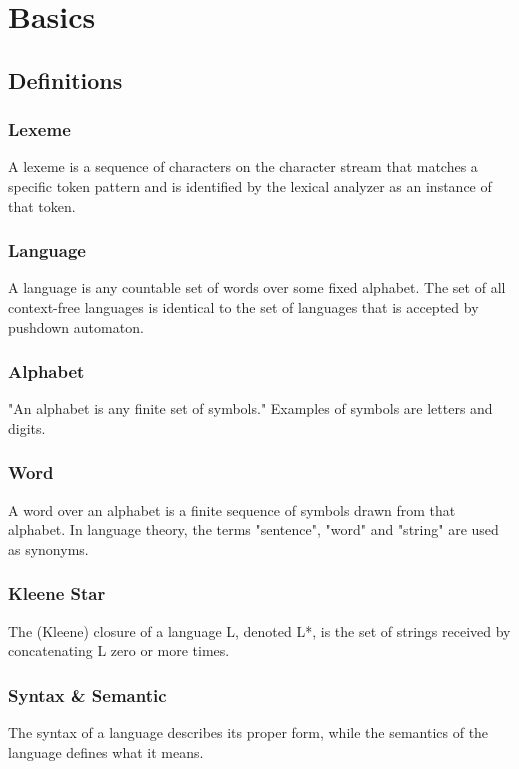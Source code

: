 \chapter{Basics}
\label{cha:basics}
\section{Definitions}
\subsection{Lexeme}
A lexeme is a sequence of characters on the character stream that matches a specific token pattern and is identified by the lexical analyzer as an instance of that token.\cite{DragonBook}

\subsection{Language}
A language is any countable set of words over some fixed alphabet. The set of all context-free languages is identical to the set of languages that is accepted by pushdown automaton.\cite{DragonBook}

\subsection{Alphabet}
"An alphabet is any finite set of symbols." Examples of symbols are letters and digits.\cite{DragonBook}

\subsection{Word} 
A word over an alphabet is a finite sequence of symbols drawn from that alphabet. In language theory, the terms "sentence", "word" and "string" are used as synonyms.\cite{DragonBook}

\subsection{Kleene Star} 
The (Kleene) closure of a language L, denoted L*, is the set of strings received by concatenating L zero or more times. \cite{DragonBook}


\subsection{Syntax \& Semantic}  
The syntax of a language describes its proper form, while the semantics of the language defines what it means. \cite{DragonBook}


